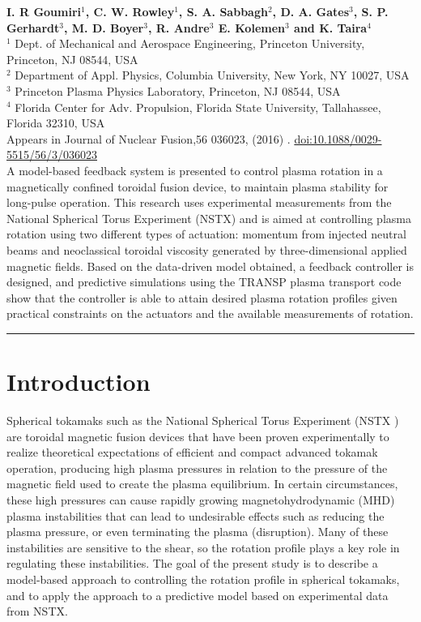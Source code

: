 \documentclass[12pt,lot, lof]{puthesis}
\begin{document}
\textbf{\large I. R Goumiri$^1$, C. W. Rowley$^1$, S. A. Sabbagh$^2$, D. A. Gates$^3$, S. P. Gerhardt$^3$, M. D. Boyer$^3$, R. Andre$^3$ E. Kolemen$^3$ and K. Taira$^4$} \\
{\footnotesize $^1$ Dept. of Mechanical and Aerospace Engineering, Princeton University, Princeton, NJ 08544, USA \\[-0.1em]
$^2$ Department of Appl. Physics, Columbia University, New York, NY 10027, USA \\[-0.1em]
$^3$ Princeton Plasma Physics Laboratory, Princeton, NJ 08544, USA \\[-0.4em] $^4$ Florida Center for Adv. Propulsion, Florida State University, Tallahassee, Florida 32310, USA \\[1em]}
%
{\footnotesize Appears in Journal of Nuclear Fusion,56 036023, (2016) . \href{http://dx.doi.org/10.1063/1.4796190}{doi:10.1088/0029-5515/56/3/036023}} \\[0.5em]

\noindent
A model-based feedback system is presented to control plasma rotation in a
magnetically confined toroidal fusion device, to maintain plasma stability for
long-pulse operation.
%
This research uses experimental measurements from the National Spherical Torus
Experiment (NSTX) and is aimed at controlling plasma rotation using two
different types of actuation: momentum
from injected neutral beams and neoclassical toroidal viscosity generated by
three-dimensional applied magnetic fields.
%
Based on the data-driven model obtained, a feedback controller is designed, and
predictive simulations using the TRANSP plasma transport code show that the
controller is able to attain desired plasma rotation profiles given practical
constraints on the actuators and the available measurements of rotation.\\

\hrule

\section{Introduction}

Spherical tokamaks such as the National Spherical Torus Experiment (NSTX
\cite{Ono00}) are toroidal magnetic fusion devices that have been proven
experimentally to realize theoretical expectations of efficient and compact
advanced tokamak operation, producing high plasma pressures in relation to the
pressure of the magnetic field used to create the plasma equilibrium. In certain
circumstances, these high pressures can cause rapidly growing
magnetohydrodynamic (MHD) plasma instabilities that can lead to undesirable
effects such as reducing the plasma pressure, or even terminating the plasma (disruption).
%
Many of these instabilities are sensitive to the shear, so the rotation profile
plays a key role in regulating these instabilities.
%
The goal of the present study is to describe a model-based approach to
controlling the rotation profile in spherical tokamaks, and to apply the
approach to a predictive model based on experimental data from NSTX.
\end{document}
